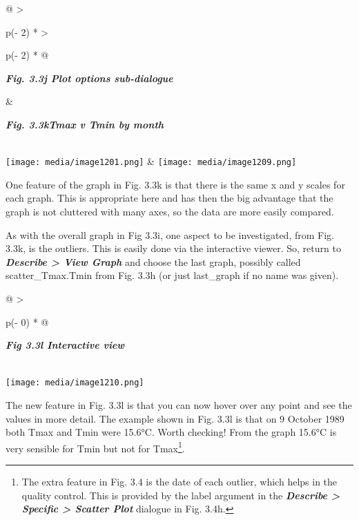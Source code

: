 \documentclass[
  letterpaper,
  DIV=11,
  numbers=noendperiod]{scrreprt}
\begin{document}
\begin{longtable}[]{@{}
  >{\raggedright\arraybackslash}p{(\columnwidth - 2\tabcolsep) * }
  >{\raggedright\arraybackslash}p{(\columnwidth - 2\tabcolsep) * }@{}}
\toprule\noalign{}
\begin{minipage}[b]{\linewidth}\raggedright
\textbf{\emph{Fig. 3.3j Plot options sub-dialogue}}
\end{minipage} & \begin{minipage}[b]{\linewidth}\raggedright
\textbf{\emph{Fig. 3.3kTmax v Tmin by month}}
\end{minipage} \\
\midrule\noalign{}
\endhead
\bottomrule\noalign{}
\endlastfoot
\texttt{[image: media/image1201.png]}
&
\texttt{[image: media/image1209.png]} \\
\end{longtable}

One feature of the graph in Fig. 3.3k is that there is the same x and y
scales for each graph. This is appropriate here and has then the big
advantage that the graph is not cluttered with many axes, so the data
are more easily compared.

As with the overall graph in Fig 3.3i, one aspect to be investigated,
from Fig. 3.3k, is the outliers. This is easily done via the interactive
viewer. So, return to \textbf{\emph{Describe \textgreater{} View Graph}}
and choose the last graph, possibly called scatter\_Tmax.Tmin from Fig.
3.3h (or just last\_graph if no name was given).

\begin{longtable}[]{@{}
  >{\raggedright\arraybackslash}p{(\columnwidth - 0\tabcolsep) * }@{}}
\toprule\noalign{}
\begin{minipage}[b]{\linewidth}\raggedright
\textbf{\emph{Fig 3.3l Interactive view}}
\end{minipage} \\
\midrule\noalign{}
\endhead
\bottomrule\noalign{}
\endlastfoot
\texttt{[image: media/image1210.png]} \\
\end{longtable}

The new feature in Fig. 3.3l is that you can now hover over any point
and see the values in more detail. The example shown in Fig. 3.3l is
that on 9 October 1989 both Tmax and Tmin were 15.6°C. Worth checking!
From the graph 15.6°C is very sensible for Tmin but not for
Tmax\footnote{The extra feature in Fig. 3.4 is the date of each outlier,
  which helps in the quality control. This is provided by the label
  argument in the \textbf{\emph{Describe \textgreater{} Specific
  \textgreater{} Scatter Plot}} dialogue in Fig. 3.4h.}.
\end{document}
